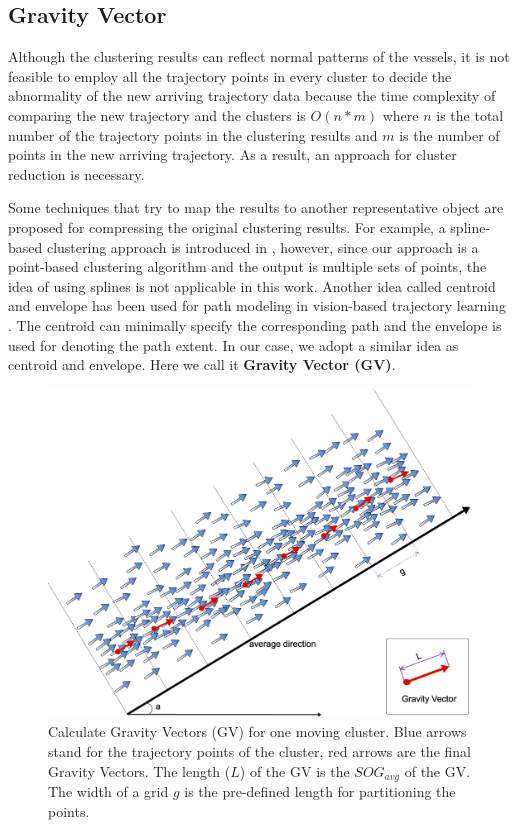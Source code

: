 \documentclass[12pt,glossary]{dalcsthesis}
\begin{document}
\subsection{Gravity Vector}
\label{subsec:gv}

Although the clustering results can reflect normal patterns of the vessels, it is not feasible to employ all the trajectory points in every cluster to decide the abnormality of the new arriving trajectory data because the time complexity of comparing the new trajectory and the clusters is $O(n*m)$ where $n$ is the total number of the trajectory points in the clustering results and $m$ is the number of points in the new arriving trajectory. As a result, an approach for cluster reduction is necessary.

Some techniques \cite{spline}\cite{visionsurvey} that try to map the results to another representative object are proposed for compressing the original clustering results. For example, a spline-based clustering approach is introduced in \cite{spline}, however, since our approach is a point-based clustering algorithm and the output is multiple sets of points, the idea of using splines is not applicable in this work. Another idea called centroid and envelope has been used for path modeling in vision-based trajectory learning \cite{visionsurvey}. The centroid can minimally specify the corresponding path and the envelope is used for denoting the path extent. In our case, we adopt a similar idea as centroid and envelope. Here we call it \textbf{Gravity Vector (GV)}. 


\begin{figure}[!htb]
\centering
\includegraphics[width=6in]{gravityCalculation.png}%
\caption{Calculate Gravity Vectors (GV) for one moving cluster. Blue arrows stand for the trajectory points of the cluster, red arrows are the final Gravity Vectors. The length ($L$) of the GV is the $SOG_{avg}$ of the GV. The width of a grid $g$ is the pre-defined length for partitioning the points.}
\label{fig:gravityPoint}
\end{figure}
\end{document}
